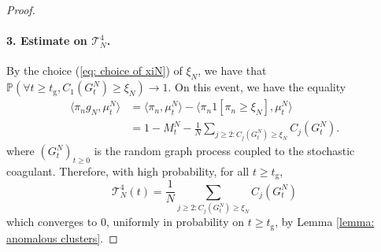 \documentclass[11pt, notitlepage]{article}
\begin{document}
\begin{proof}
       \paragraph{3. Estimate on $\mathcal{T}^4_N$.} By the choice (\ref{eq: choice of xiN}) of $\xi_N$, we have that $\mathbb{P}(\forall  t\geq t_\mathrm{g}, C_1(G^N_t)\geq \xi_N)\rightarrow 1.$ On this event, we have the equality \begin{equation}
           \begin{split}
               \langle \pi_n g_N, \mu^N_t\rangle &=\langle \pi_n, \mu^N_t\rangle - \langle \pi_n 1[\pi_n\geq \xi_N], \mu^N_t\rangle  \\[2ex] & = 1-M^N_t-\frac{1}{N}\sum_{j\ge 2:C_j(G^N_t)\ge \xi_N} C_j(G^N_t). 
           \end{split} 
       \end{equation} where $(G^N_t)_{t\geq 0}$ is the random graph process coupled to the stochastic coagulant. Therefore, with high probability, for all $t\ge t_\mathrm{g}$, \begin{equation} \mathcal{T}^4_N(t) = \frac{1}{N}\sum_{j\ge 2:C_j(G^N_t)\ge \xi_N} C_j(G^N_t) \end{equation} which converges to $0$, uniformly in probability on $t\geq t_\mathrm{g}$, by Lemma \ref{lemma: anomalous clusters}.

\end{proof}
\end{document}
